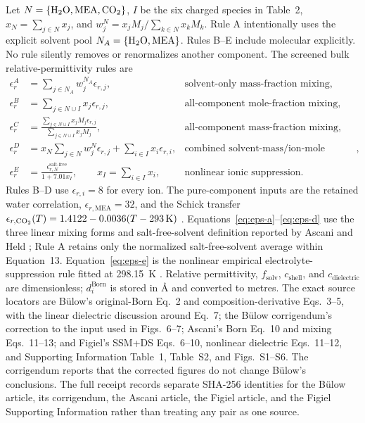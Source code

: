 \documentclass[10pt,oneside]{scrartcl}
\begin{document}
Let $N=\{\ce{H2O},\ce{MEA},\ce{CO2}\}$, $I$ be the six charged species in
Table~2, $x_N=\sum_{j\in N}x_j$, and
$w_j^N=x_jM_j/\sum_{k\in N}x_kM_k$. Rule A intentionally uses the explicit
solvent pool $N_A=\{\ce{H2O},\ce{MEA}\}$. Rules B--E include molecular
 explicitly. No rule silently removes or renormalizes another
component. The screened bulk relative-permittivity rules
are
\begin{align}
\epsilon_r^A &= \sum_{j\in N_A}w_j^{N_A}\epsilon_{r,j},
&\text{solvent-only mass-fraction mixing},\label{eq:eps-a}\\
\epsilon_r^B &= \sum_{j\in N\cup I}x_j\epsilon_{r,j},
&\text{all-component mole-fraction mixing},\label{eq:eps-b}\\
\epsilon_r^C &= \frac{\sum_{j\in N\cup I}x_jM_j\epsilon_{r,j}}
{\sum_{j\in N\cup I}x_jM_j},
&\text{all-component mass-fraction mixing},\label{eq:eps-c}\\
\epsilon_r^D &= x_N\sum_{j\in N}w_j^N\epsilon_{r,j}
 +\sum_{i\in I}x_i\epsilon_{r,i},
&\text{combined solvent-mass/ion-mole mixing},\label{eq:eps-d}\\
\epsilon_r^E &= \frac{\epsilon_{r,N}^{\mathrm{salt\text{-}free}}}
{1+7.01x_I},\qquad x_I=\sum_{i\in I}x_i,
&\text{nonlinear ionic suppression}.\label{eq:eps-e}
\end{align}
Rules B--D use $\epsilon_{r,i}=8$ for every ion. The pure-component inputs
are the retained water correlation, $\epsilon_{r,\mathrm{MEA}}=32$, and the
Schick transfer
$\epsilon_{r,\ce{CO2}}(T)=1.4122-0.0036(T-293\,\mathrm{K})$
\cite[Table~2]{Schick2023}. Equations~\ref{eq:eps-a}--\ref{eq:eps-d} use the
three linear mixing forms and salt-free-solvent definition reported by Ascani
and Held \cite[Eqns.~11--13]{Ascani2021}; Rule A retains only the normalized
salt-free-solvent average within Equation~13. Equation~\ref{eq:eps-e} is the
nonlinear empirical electrolyte-suppression rule fitted at \SI{298.15}{K}
\cite[Eqns.~11--12]{Figiel2025}. Relative permittivity, $f_{\mathrm{solv}}$,
$c_{\mathrm{shell}}$, and $c_{\mathrm{dielectric}}$ are dimensionless;
$d_i^{\mathrm{Born}}$ is stored in \si{\angstrom} and converted to metres.
The exact source locators are B\"ulow's original-Born Eq.~2 and
composition-derivative Eqs.~3--5, with the linear dielectric discussion around
Eq.~7; the B\"ulow corrigendum's correction to the input used in Figs.~6--7;
Ascani's Born Eq.~10 and mixing Eqs.~11--13; and Figiel's SSM+DS Eqs.~6--10,
nonlinear dielectric Eqs.~11--12, and Supporting Information Table~1,
Table~S2, and Figs.~S1--S6. The corrigendum reports that the corrected figures
do not change B\"ulow's conclusions. The full receipt records separate
SHA-256 identities for the B\"ulow article, its corrigendum, the Ascani
article, the Figiel article, and the Figiel Supporting Information rather
than treating any pair as one source.
\end{document}
